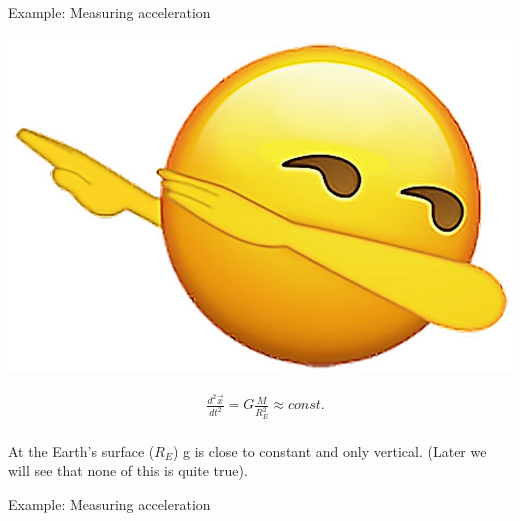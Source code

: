 \begin{frame}
\begin{PointSix}{Example: Measuring acceleration}
  \begin{minipage}[t]{0.3\textwidth}
    \includegraphics[width=\textwidth]{Figures/General/IcandothisSmiley_Kindpng.png}
    \end{minipage}\begin{minipage}[]{0.7\textwidth}
  \centering
  \begin{align*}
  &\frac{d^2\vec{x}}{dt^2} = G\frac{M}{R_E^2} \approx const. \\
  \end{align*}
\end{minipage}
 \small
  At the Earth's surface ($R_E$) g is close to constant and only vertical. (Later we will see that none of this is quite true).

\end{PointSix}
\end{frame}

\begin{frame}
  \begin{PointSix}{Example: Measuring acceleration}
  \end{PointSix}
\end{frame}

